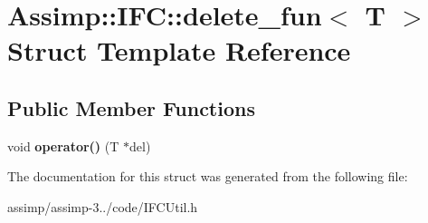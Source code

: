 \hypertarget{struct_assimp_1_1_i_f_c_1_1delete__fun}{\section{Assimp\+:\+:I\+F\+C\+:\+:delete\+\_\+fun$<$ T $>$ Struct Template Reference}
\label{struct_assimp_1_1_i_f_c_1_1delete__fun}
}
\subsection*{Public Member Functions}
\begin{DoxyCompactItemize}
\item 
\hypertarget{struct_assimp_1_1_i_f_c_1_1delete__fun_a16fb4133fac2e609463ff4e666e60ba0}{void {\bfseries operator()} (T $\ast$del)}\label{struct_assimp_1_1_i_f_c_1_1delete__fun_a16fb4133fac2e609463ff4e666e60ba0}

\end{DoxyCompactItemize}


The documentation for this struct was generated from the following file\+:\begin{DoxyCompactItemize}
\item 
assimp/assimp-\/3../code/I\+F\+C\+Util.\+h\end{DoxyCompactItemize}
